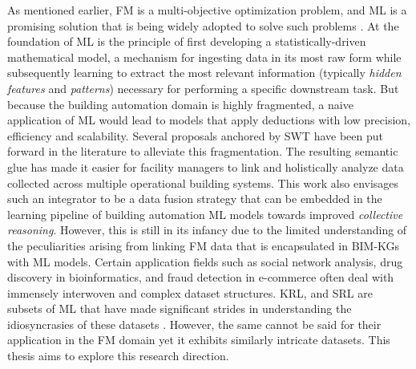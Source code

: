 As mentioned earlier, \ac{FM} is a multi-objective optimization problem, and \ac{ML} is a promising solution that is being widely adopted to solve such problems \citep{Toffolo2002, Asadi2012Multi-objectiveApplication, Shaikh2018, Chen2018b, Merlet2022IntegrationRetrofit, Wijeratne2022Multi-objectivePhase}. At the foundation of ML is the principle of first developing a statistically-driven mathematical model, a mechanism for ingesting data in its most raw form while subsequently learning to extract the most relevant information (typically \textit{hidden} \textit{features} and  \textit{patterns}) necessary for performing a specific downstream task. 
But because the building automation domain is highly fragmented, a naive application of \ac{ML} would lead to models that apply deductions with low precision, efficiency and scalability. Several proposals anchored by \ac{SWT} have been put forward in the literature \citep{Pauwels, Pauwels2016, Pauwels2017a, Rasmussen2019a, Pauwels2022KnowledgeEnvironment} to alleviate this fragmentation. The resulting semantic glue has made it easier for facility managers to link and holistically analyze data collected across multiple operational building systems. This work also envisages such an integrator to be a data fusion strategy that can be embedded in the learning pipeline of building automation \ac{ML} models towards improved \textit{collective reasoning}. However, this is still in its infancy due to the limited understanding of the peculiarities arising from linking \ac{FM} data that is encapsulated in \acp{BIM-KG} with \ac{ML} models. Certain application fields such as social network analysis, drug discovery in bioinformatics, and fraud detection in e-commerce often deal with immensely interwoven and complex dataset structures. \ac{KRL}, and \ac{SRL} are subsets of \ac{ML} that have made significant strides in understanding the idiosyncrasies of these datasets \citep{Nickel2011, Nickel2012FactorizingYAGO, 
Bengio2013RepresentationPerspectives,Nickel2016AGraphsb, Lin2018KnowledgeReview, Yi2022GraphApplications}. However, the same cannot be said for their application in the \ac{FM} domain yet it exhibits similarly intricate datasets. This thesis aims to explore this research direction. 

